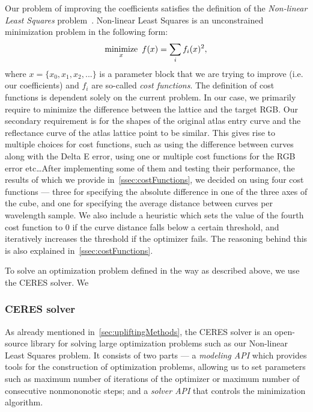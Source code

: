 Our problem of improving the coefficients satisfies the definition of the \emph{Non-linear Least Squares} problem~\cite{nonLinearLeastSquares}. Non-linear Least Squares is an unconstrained minimization problem in the following form:
\begin{equation} \label{eq:nonLinearLeastSquares}
	 \underset{x}{\text{minimize}} \hspace{0.5em} f(x) = \sum_{i} f_{i}(x)^{2},
\end{equation}
where $x= \{x_{0}, x_{1}, x_{2}, ... \}$ is a parameter block that we are trying to improve (i.e. our coefficients) and $f_{i}$ are so-called \emph{cost functions}. The definition of cost functions is dependent solely on the current problem. In our case, we primarily require to minimize the difference between the lattice and the target RGB. Our secondary requirement is for the shapes of the original atlas entry curve and the reflectance curve of the atlas lattice point to be similar. This gives rise to multiple choices for cost functions, such as using the difference between curves along with the Delta E error, using one or multiple cost functions for the RGB error etc\ldots After implementing some of them and testing their performance, the results of which we provide in~\cref{ssec:costFunctions}, we decided on using four cost functions --- three for specifying the absolute difference in one of the three axes of the cube, and one for specifying the average distance between curves per wavelength sample. We also include a heuristic which sets the value of the fourth cost function to 0 if the curve distance falls below a certain threshold, and iteratively increases the threshold if the optimizer fails. The reasoning behind this is also explained in~\cref{ssec:costFunctions}.

To solve an optimization problem defined in the way as described above, we use the CERES solver. We 

\subsubsection{CERES solver} \label{sssec:ceresSolver}

As already mentioned in~\cref{sec:upliftingMethods}, the CERES solver is an open-source library for solving large optimization problems such as our Non-linear Least Squares problem. It consists of two parts --- a \emph{modeling API} which provides tools for the construction of optimization problems, allowing us to set parameters such as maximum number of iterations of the optimizer or maximum number of consecutive nonmononotic steps; and a \emph{solver API} that controls the minimization algorithm.

